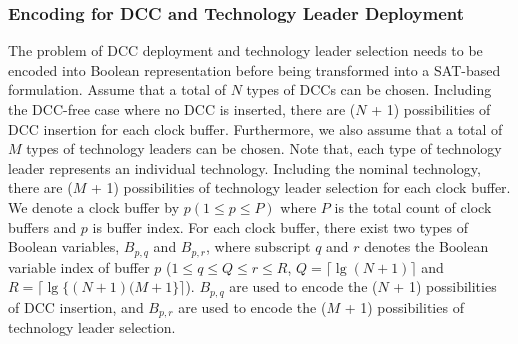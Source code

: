 \subsubsection{Encoding for DCC and Technology Leader Deployment}
\label{sec:TVA:leader_encode}
The problem of DCC deployment and technology leader selection needs to be encoded into Boolean representation before being transformed into a SAT-based formulation. Assume that a total of $N$ types of DCCs can be chosen. Including the DCC-free case where no DCC is inserted, there are ($N$ + 1) possibilities of DCC insertion for each clock buffer. Furthermore, we also assume that a total of $M$ types of technology leaders can be chosen. Note that, each type of technology leader represents an individual technology. Including the nominal technology, there are ($M$ + 1) possibilities of technology leader selection for each clock buffer. We denote a clock buffer by $p\left(1 \leq p \leq P\right)$ where $P$ is the total count of clock buffers and $p$ is buffer index. For each clock buffer, there exist two types of Boolean variables, $B_{p,q}$ and $B_{p,r}$, where subscript $q$ and $r$ denotes the Boolean variable index of buffer $p$ ($1 \leq q \leq Q \leq r \leq R$, $Q = \lceil \lg (N + 1)\rceil$ and $R = \lceil \lg \{(N + 1)(M + 1\}\rceil$). $B_{p,q}$ are used to encode the ($N$ + 1) possibilities of DCC insertion, and $B_{p,r}$ are used to encode the ($M$ + 1) possibilities of technology leader selection.



